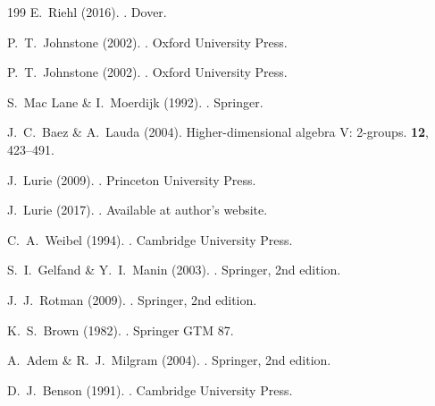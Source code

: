 \documentclass[11pt,a4paper,openright]{book}
\theoremstyle{plain}
\theoremstyle{definition}
\begin{document}
\begin{thebibliography}{199}
E.~Riehl (2016).
.
\newblock Dover.

P.~T.~Johnstone (2002).
.
\newblock Oxford University Press.

P.~T.~Johnstone (2002).
.
\newblock Oxford University Press.

S.~Mac Lane \& I.~Moerdijk (1992).
.
\newblock Springer.

J.~C.~Baez \& A.~Lauda (2004).
\newblock Higher-dimensional algebra V: 2-groups.
 {\bf 12}, 423--491.

J.~Lurie (2009).
.
\newblock Princeton University Press.

J.~Lurie (2017).
.
\newblock Available at author's website.


C.~A.~Weibel (1994).
.
\newblock Cambridge University Press.

S.~I.~Gelfand \& Y.~I.~Manin (2003).
.
\newblock Springer, 2nd edition.

J.~J.~Rotman (2009).
.
\newblock Springer, 2nd edition.

K.~S.~Brown (1982).
.
\newblock Springer GTM 87.

A.~Adem \& R.~J.~Milgram (2004).
.
\newblock Springer, 2nd edition.

D.~J.~Benson (1991).
.
\newblock Cambridge University Press.



\end{thebibliography}
\end{document}
